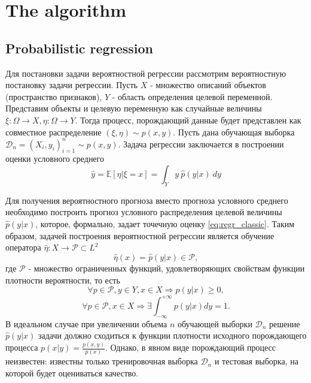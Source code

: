 \documentclass[fleqn,usenatbib]{mnras}
\begin{document}

\section{The algorithm}

\subsection{Probabilistic regression}
Для постановки задачи вероятностной регрессии рассмотрим вероятностную постановку задачи регрессии. Пусть \(X\) - множество описаний объектов (пространство признаков), \(Y\) - область определения целевой переменной. Представим объекты и целевую переменную как случайные величины \(\xi : \Omega \rightarrow X, \eta : \Omega \rightarrow Y \). Тогда процесс, порождающий данные будет представлен как совместное распределение \((\xi, \eta) \sim p(x, y)\). Пусть дана обучающая выборка \(\mathcal{D}_n = (X_i, y_i)_{i=1}^n \sim p(x,y)\). Задача регрессии заключается в построении оценки условного среднего
\begin{equation}\label{eq:regr_classic}
     \hat{y} = \mathbb{E}[\eta | \xi = x] = \int_Y y ~ \hat{p}(y|x) ~ dy
\end{equation}

Для получения вероятностного прогноза вместо прогноза условного среднего необходимо построить прогноз условного распределения целевой величины \(\hat{p}(y|x)\), которое, формально, задает точечную оценку \eqref{eq:regr_classic}. Таким образом, задачей построения вероятностной регрессии является обучение оператора \(\hat{\eta} : X \rightarrow \mathcal{P} \subset L^2\)
\begin{equation}
    \hat{\eta}(x) = \hat{p}(y|x) \in \mathcal{P},
\end{equation}
где \(\mathcal{P}\) - множество ограниченных функций, удовлетворяющих свойствам функции плотности вероятности, то есть
\begin{equation}
    \forall p \in \mathcal{P}, y \in Y, x \in X \Rightarrow p(y|x) \geq 0,
\end{equation}
\begin{equation}
    \forall p \in \mathcal{P}, x \in X \Rightarrow \exists \int_{-\infty}^{+\infty} p(y|x) dy = 1.
\end{equation}
В идеальном случае при увеличении объема \(n\) обучающей выборки \(\mathcal{D}_n\) решение \(\hat{p}(y|x)\) задачи должно сходиться к функции плотности исходного порождающего процесса \(p(x|y) = \frac{p(x,y)}{p(x)}\). Однако, в явном виде порождающий процесс неизвестен: известны только тренировочная выборка \(\mathcal{D}_n\) и тестовая выборка, на которой будет оцениваться качество.
\end{document}
